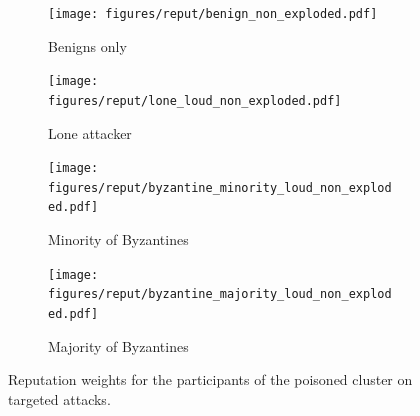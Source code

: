 \begin{figure}[t]
    \centering
     \begin{subfigure}{0.45\columnwidth}
    \centering 
    \texttt{[image: figures/reput/benign\_non\_exploded.pdf]}
    \caption{Benigns only}
    \label{fig:benign_targeted_non_exploded}
  \end{subfigure}
    \hfill 
     \begin{subfigure}{0.45\columnwidth}
    \centering 
    \texttt{[image: figures/reput/lone\_loud\_non\_exploded.pdf]}
    \caption{Lone attacker}
    \label{fig:lone_loud_non_exploded}
  \end{subfigure}
    \hfill 
    \begin{subfigure}{0.45\columnwidth}
    \centering 
    \texttt{[image: figures/reput/byzantine\_minority\_loud\_non\_exploded.pdf]}
    \caption{Minority of Byzantines}
    \label{fig:byzantine_minority_loud_non_exploded}
  \end{subfigure}
    \hfill 
  \begin{subfigure}{0.45\columnwidth}
    \centering 
    \texttt{[image: figures/reput/byzantine\_majority\_loud\_non\_exploded.pdf]}
    \caption{Majority of Byzantines}
    \label{fig:byzantine_majority_loud_non_exploded}
  \end{subfigure}
    \caption{Reputation weights for the participants of the poisoned cluster on targeted attacks.}
    \label{fig:non_exploded_reputation}
\end{figure}


